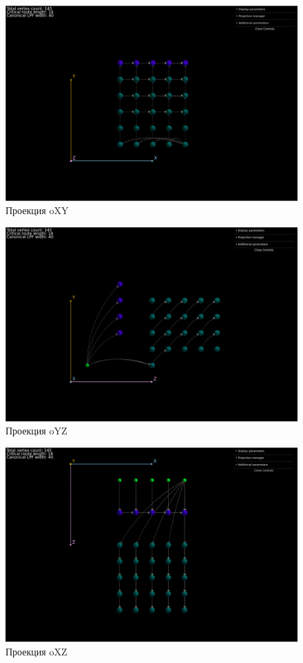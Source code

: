 \documentclass[oneside, final, 14pt]{extarticle}
\begin{document}
\begin{figure}[H]
    \centering
    \includegraphics[width=\mygraphwidth]{2.png}
    \caption{Проекция oXY}
\end{figure}

\begin{figure}[H]
    \centering
    \includegraphics[width=\mygraphwidth]{3.png}
    \caption{Проекция oYZ}
\end{figure}

\begin{figure}[H]
    \centering
    \includegraphics[width=\mygraphwidth]{4.png}
    \caption{Проекция oXZ}
\end{figure}
\end{document}
